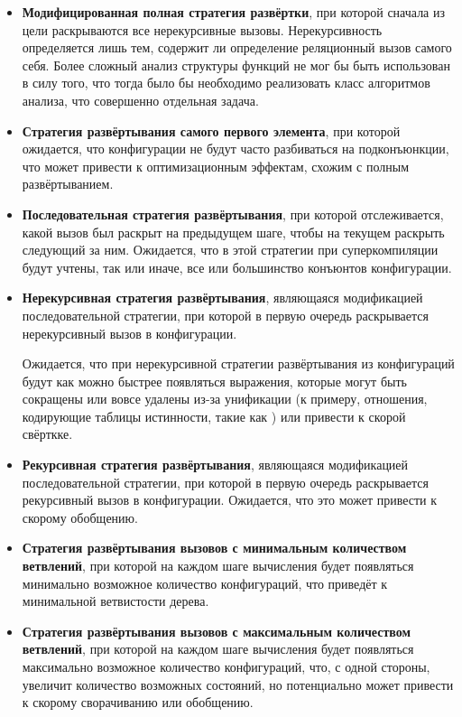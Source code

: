\begin{itemize}
\item {\bf Модифицированная полная стратегия развёртки}, при которой сначала из цели
      раскрываются все нерекурсивные вызовы.
      Нерекурсивность определяется
      лишь тем, содержит ли определение реляционный вызов самого себя. Более сложный
      анализ структуры функций не мог бы быть использован в силу того, что тогда
      было бы необходимо реализовать класс алгоритмов анализа, что совершенно отдельная задача.

\item {\bf Стратегия развёртывания самого первого элемента}, при которой ожидается,
      что конфигурации не будут часто разбиваться на подконъюнкции, что может
      привести к оптимизационным эффектам, схожим с полным развёртыванием.

\item {\bf Последовательная стратегия развёртывания}, при которой отслеживается,
      какой вызов был раскрыт на предыдущем шаге, чтобы на текущем
      раскрыть следующий за ним. Ожидается, что в этой стратегии
      при суперкомпиляции будут учтены, так или иначе, все или большинство конъюнтов
      конфигурации.

\item {\bf Нерекурсивная стратегия развёртывания}, являющаяся модификацией
      последовательной стратегии, при которой в первую очередь
      раскрывается нерекурсивный вызов в конфигурации.

      Ожидается, что при нерекурсивной стратегии развёртывания из конфигураций
      будут как можно быстрее появляться выражения, которые могут быть сокращены
      или вовсе удалены из-за унификации (к примеру, отношения, кодирующие
      таблицы истинности, такие как ) или привести к скорой свёрткке.

\item {\bf Рекурсивная стратегия развёртывания}, являющаяся модификацией
      последовательной стратегии,  при которой в первую очередь
      раскрывается рекурсивный вызов в конфигурации. Ожидается, что это
      может привести к скорому обобщению.

\item {\bf Стратегия развёртывания вызовов с минимальным количеством ветвлений},
      при которой на каждом шаге вычисления будет появляться минимально возможное количество
      конфигураций, что приведёт к минимальной ветвистости дерева.

\item {\bf Стратегия развёртывания вызовов с максимальным количеством ветвлений},
      при которой на каждом шаге вычисления будет появляться максимально возможное количество
      конфигураций, что, с одной стороны, увеличит количество возможных состояний, но
      потенциально может привести к скорому сворачиванию или обобщению.

\end{itemize}

